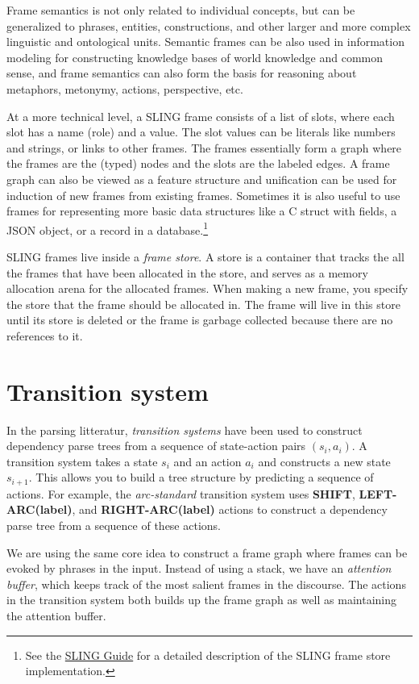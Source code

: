 \documentclass[11pt,a4paper]{article}
\begin{document}
Frame semantics is not only related to individual concepts, but can be generalized
to phrases, entities, constructions, and other larger and more complex linguistic
and ontological units. Semantic frames can be also used in information modeling
for constructing knowledge bases of world knowledge and common sense, and frame
semantics can also form the basis for reasoning about metaphors, metonymy,
actions, perspective, etc.

At a more technical level, a SLING frame consists of a list of slots, where each
slot has a name (role) and a value. The slot values can be literals like numbers
and strings, or links to other frames. The frames essentially form a graph where
the frames are the (typed) nodes and the slots are the labeled edges. A frame
graph can also be viewed as a feature structure \cite{carpenter2005} and
unification can be used for induction of new frames from existing frames.
Sometimes it is also useful to use frames for representing more basic data
structures like a C struct with fields, a JSON object, or a record in a
database.\footnote{See the \href{https://github.com/google/sling/blob/master/frame/README.md}{SLING Guide}
for a detailed description of the SLING frame store implementation.}

SLING frames live inside a \emph{frame store}. A store is a container that
tracks the all the frames that have been allocated in the store, and serves as a
memory allocation arena for the allocated frames. When making a new frame, you
specify the store that the frame should be allocated in. The frame will live in
this store until its store is deleted or the frame is garbage collected because
there are no references to it.

\section{Transition system}

In the parsing litteratur, \emph{transition systems} have been
used to construct dependency parse trees from a sequence of state-action pairs
$(s_i,a_i)$. A transition system takes a state $s_i$ and an action $a_i$ and
constructs a new state $s_{i+1}$. This allows you to build a tree structure by
predicting a sequence of actions. For example, the \emph{arc-standard}
transition system \cite{nivre2006} uses {\bf SHIFT}, {\bf LEFT-ARC(label)}, and
{\bf RIGHT-ARC(label)} actions to construct a dependency parse tree from a
sequence of these actions.

We are using the same core idea to construct a frame graph where frames can be
evoked by phrases in the input. Instead of using a stack, we have an
\emph{attention buffer}, which keeps track of the most salient frames in the
discourse. The actions in the transition system both builds up the frame graph
as well as maintaining the attention buffer.
\end{document}
